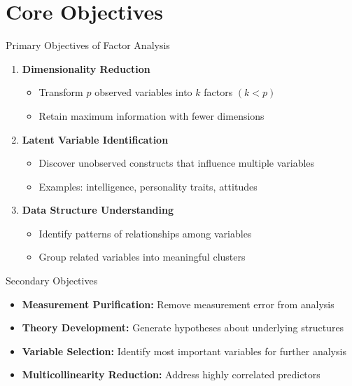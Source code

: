 \documentclass[aspectratio=169]{beamer}
\begin{document}
\section{Core Objectives}
\begin{frame}
  \sectionpage
\end{frame}
\begin{frame}{Primary Objectives of Factor Analysis}
  \begin{enumerate}
    \item \textbf{Dimensionality Reduction}
    \begin{itemize}
      \item Transform $p$ observed variables into $k$ factors $(k < p)$
      \item Retain maximum information with fewer dimensions
    \end{itemize}
    
    \item \textbf{Latent Variable Identification}
    \begin{itemize}
      \item Discover unobserved constructs that influence multiple variables
      \item Examples: intelligence, personality traits, attitudes
    \end{itemize}
    
    \item \textbf{Data Structure Understanding}
    \begin{itemize}
      \item Identify patterns of relationships among variables
      \item Group related variables into meaningful clusters
    \end{itemize}
  \end{enumerate}
\end{frame}

\begin{frame}{Secondary Objectives}
  \begin{itemize}
    \item \textbf{Measurement Purification:} Remove measurement error from analysis
    \item \textbf{Theory Development:} Generate hypotheses about underlying structures
    \item \textbf{Variable Selection:} Identify most important variables for further analysis
    \item \textbf{Multicollinearity Reduction:} Address highly correlated predictors
  \end{itemize}
\end{frame}
\end{document}
